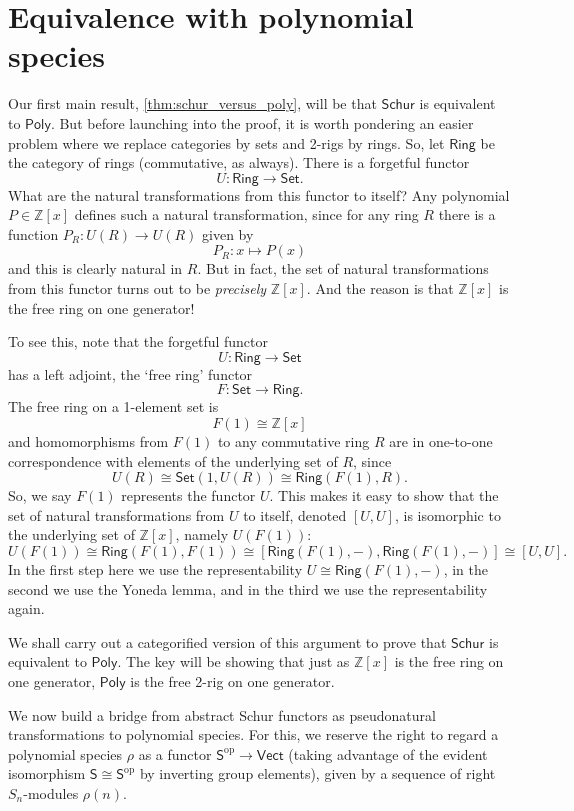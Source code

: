 \documentclass[12pt,reqno]{amsart}
\theoremstyle{plain}
\theoremstyle{definition}
\theoremstyle{remark}
\newcommand{\maps}{\colon}
\newcommand{\op}{^\mathrm{op}}
\newcommand{\category}[1]{\mathsf{#1}}
\renewcommand{\S}{\category S}
\newcommand{\Z}{\mathbb Z}
\newcommand{\namedcat}[1]{\mathsf{#1}}
\newcommand{\Poly}{\namedcat{Poly}}
\newcommand{\Ring}{\namedcat{Ring}}
\newcommand{\Set}{\namedcat{Set}}
\newcommand{\Schur}{\namedcat{Schur}}
\newcommand{\Vect}{\namedcat{Vect}}
\numberwithin{thm}{section}
\begin{document}
\section{Equivalence with polynomial species}
\label{sec:Poly}

Our first main result, \cref{thm:schur_versus_poly}, will be that $\Schur$ is equivalent to $\Poly$. But before launching into the proof, it is worth pondering an easier problem where we replace categories by sets and 2-rigs by rings. So, let $\Ring$ be the category of rings (commutative, as always). There is a forgetful functor 
\[ 
    U \maps \Ring \to \Set.
\]
What are the natural transformations from this functor to itself? Any polynomial $P \in \Z[x]$ defines such a natural transformation, since for any ring $R$ there is a function $P_R \maps U(R) \to U(R)$ given by
\[ 
    P_R \maps x \mapsto P(x) 
\]
and this is clearly natural in $R$. But in fact, the set of natural transformations from this functor turns out to be \emph{precisely} $\Z[x]$. And the reason is that $\Z[x]$ is the free ring on one generator!  

To see this, note that the forgetful functor
\[ 
    U \maps \Ring \to \Set  
\]
has a left adjoint, the `free ring' functor
\[ 
    F \maps \Set \to \Ring  . 
\] 
The free ring on a 1-element set is
\[ 
    F(1) \cong \Z[x] 
\]
and homomorphisms from $F(1)$ to any commutative ring $R$ are in one-to-one correspondence with elements of the underlying set of $R$, since
\[ 
    U(R) \cong \Set(1, U(R)) \cong \Ring(F(1), R). 
\]
So, we say $F(1)$ represents the functor $U$. This makes it easy to show that the set of natural transformations from $U$ to itself, denoted $[U, U]$, is isomorphic to the underlying set of $\Z[x]$, namely $U(F(1))$:
\[
     U(F(1)) \cong \Ring(F(1), F(1)) \cong [\Ring(F(1), -), \Ring(F(1), -)] \cong [U, U]. 
\] 
In the first step here we use the representability $U \cong \Ring(F(1), -)$, in the second we use the Yoneda lemma, and in the third we use the representability again.

We shall carry out a categorified version of this argument to prove that $\Schur$ is equivalent to $\Poly$. The key will be showing that just as $\Z[x]$ is the free ring on one generator, $\Poly$ is the free 2-rig on one generator. 

We now build a bridge from abstract Schur functors as pseudonatural transformations to polynomial species. For this, we reserve the right to regard a polynomial species $\rho$ as a functor $\S\op \to \Vect$ (taking advantage of the evident isomorphism $\S \cong \S\op$ by inverting group elements), given by a sequence of right $S_n$-modules $\rho(n)$.
\end{document}
